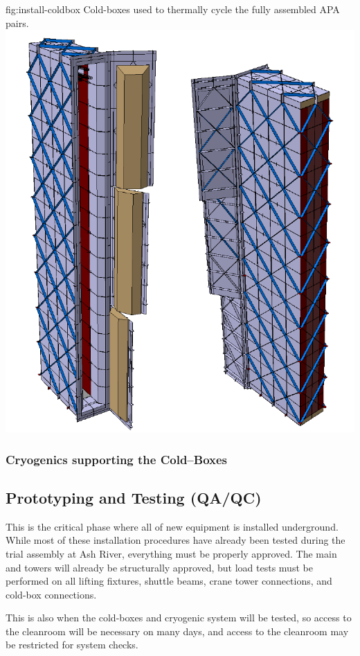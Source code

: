 \begin{dunefigure}{fig:install-coldbox}
  {Cold-boxes used to thermally cycle the fully assembled APA pairs. }
\includegraphics[width=.5\textwidth]{graphics/install-coldbox.pdf}
\end{dunefigure}

\subsubsection{Cryogenics supporting the Cold--Boxes}


\clearpage

\subsection{Prototyping and Testing (QA/QC)}
\label{sec:fdsp-tc-infr-qaqc}
This is the critical phase where all of new equipment is installed underground.  While most of these installation procedures have already been tested during the trial assembly at Ash River, everything must be properly approved. The main  and  towers will already be structurally approved, but load tests must be performed on all lifting fixtures, shuttle beams, crane tower connections, and cold-box connections. 

This is also when the cold-boxes and cryogenic system will be tested, so access to the cleanroom will be necessary on many days, and access to the cleanroom may be restricted for system checks.


